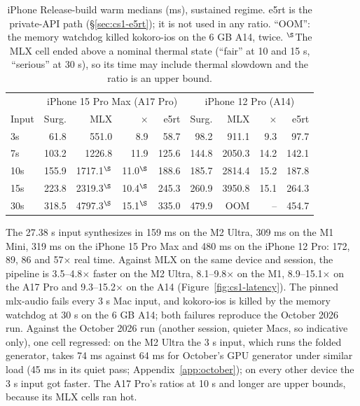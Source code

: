 \documentclass[11pt]{article}
\begin{document}
\begin{table}[h]
\centering
\small
\caption{iPhone Release-build warm medians (ms), sustained regime. e5rt is the private-API path (\S\ref{sec:cs1-e5rt}); it is not used in any ratio. ``OOM'': the memory watchdog killed kokoro-ios on the 6 GB A14, twice. $^\S$The MLX cell ended above a nominal thermal state (``fair'' at 10 and 15 s, ``serious'' at 30 s), so its time may include thermal slowdown and the ratio is an upper bound.}
\label{tab:cs1-iphone}
\begin{tabular}{lrrrrrrrr}
\toprule
 & \multicolumn{4}{c}{iPhone 15 Pro Max (A17 Pro)} & \multicolumn{4}{c}{iPhone 12 Pro (A14)} \\
Input & Surg. & MLX & $\times$ & e5rt & Surg. & MLX & $\times$ & e5rt \\
\midrule
3s  & 61.8 & 551.0 & 8.9 & 58.7 & 98.2 & 911.1 & 9.3 & 97.7 \\
7s  & 103.2 & 1226.8 & 11.9 & 125.6 & 144.8 & 2050.3 & 14.2 & 142.1 \\
10s & 155.9 & 1717.1$^\S$ & 11.0$^\S$ & 188.6 & 185.7 & 2814.4 & 15.2 & 187.8 \\
15s & 223.8 & 2319.3$^\S$ & 10.4$^\S$ & 245.3 & 260.9 & 3950.8 & 15.1 & 264.3 \\
30s & 318.5 & 4797.3$^\S$ & 15.1$^\S$ & 335.0 & 479.9 & OOM & -- & 454.7 \\
\bottomrule
\end{tabular}
\end{table}

The 27.38 s input synthesizes in 159 ms on the M2 Ultra, 309 ms on the M1 Mini, 319 ms on the iPhone 15 Pro Max and 480 ms on the iPhone 12 Pro: 172, 89, 86 and 57$\times$ real time. Against MLX on the same device and session, the pipeline is 3.5--4.8$\times$ faster on the M2 Ultra, 8.1--9.8$\times$ on the M1, 8.9--15.1$\times$ on the A17 Pro and 9.3--15.2$\times$ on the A14 (Figure~\ref{fig:cs1-latency}). The pinned mlx-audio fails every 3 s Mac input, and kokoro-ios is killed by the memory watchdog at 30 s on the 6 GB A14; both failures reproduce the October 2026 run. Against the October 2026 run (another session, quieter Macs, so indicative only), one cell regressed: on the M2 Ultra the 3 s input, which runs the folded generator, takes 74 ms against 64 ms for October's GPU generator under similar load (45 ms in its quiet pass; Appendix~\ref{app:october}); on every other device the 3 s input got faster. The A17 Pro's ratios at 10 s and longer are upper bounds, because its MLX cells ran hot.
\end{document}
